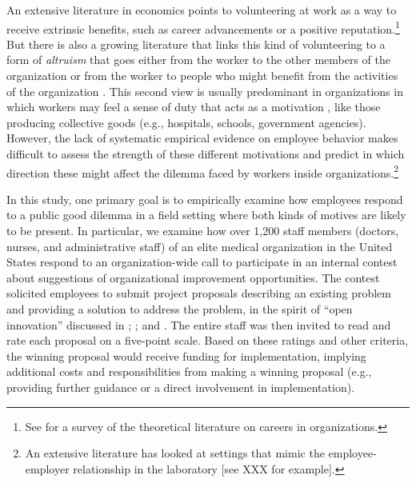 \documentclass[11pt, titlepage]{article}
\begin{document}
An extensive literature in economics points to volunteering at work as a
way to receive extrinsic benefits, such as career advancements or a
positive reputation.\footnote{See \citet{gibbons1999careers} for a
  survey of the theoretical literature on careers in organizations.} But
there is also a growing literature that links this kind of volunteering
to a form of \emph{altruism} that goes either from the worker to the
other members of the organization
\citep{bandiera2005social, rotemberg2006altruism} or from the worker to
people who might benefit from the activities of the organization
\citep{delfgaauw2005dedicated, delfgaauw2008incentives, prendergast2007motivation}.
This second view is usually predominant in organizations in which
workers may feel a sense of duty that acts as a motivation
\citep{akerlof2005identity, besley2005competition}, like those producing
collective goods (e.g., hospitals, schools, government agencies).
However, the lack of systematic empirical evidence on employee behavior
makes difficult to assess the strength of these different motivations
and predict in which direction these might affect the dilemma faced by
workers inside organizations.\footnote{An extensive literature has
  looked at settings that mimic the employee-employer relationship in
  the laboratory {[}see XXX for example{]}.}

In this study, one primary goal is to empirically examine how employees
respond to a public good dilemma in a field setting where both kinds of
motives are likely to be present. In particular, we examine how over
1,200 staff members (doctors, nurses, and administrative staff) of an
elite medical organization in the United States respond to an
organization-wide call to participate in an internal contest about
suggestions of organizational improvement opportunities. The contest
solicited employees to submit project proposals describing an existing
problem and providing a solution to address the problem, in the spirit
of ``open innovation'' discussed in \citet{terwiesch2008innovation};
\citet{lakhani2013prize}; and \citet{glaeser2016predictive}. The entire
staff was then invited to read and rate each proposal on a five-point
scale. Based on these ratings and other criteria, the winning proposal
would receive funding for implementation, implying additional costs and
responsibilities from making a winning proposal (e.g., providing further
guidance or a direct involvement in implementation).
\end{document}
